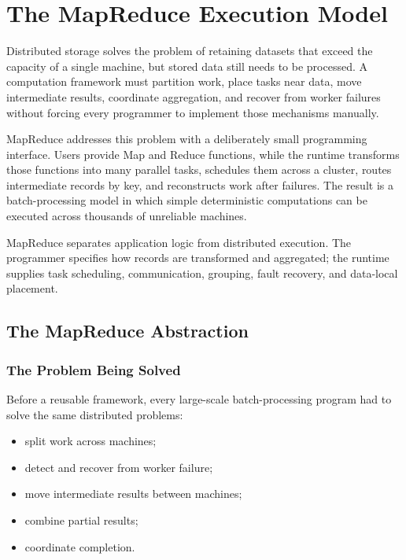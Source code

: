 \documentclass[11pt,a4paper,oneside]{book}
\begin{document}
\chapter{The MapReduce Execution Model}
\label{chap:mapreduce}

Distributed storage solves the problem of retaining datasets that exceed the capacity of a single machine, but stored data still needs to be processed. A computation framework must partition work, place tasks near data, move intermediate results, coordinate aggregation, and recover from worker failures without forcing every programmer to implement those mechanisms manually.

MapReduce addresses this problem with a deliberately small programming interface. Users provide Map and Reduce functions, while the runtime transforms those functions into many parallel tasks, schedules them across a cluster, routes intermediate records by key, and reconstructs work after failures. The result is a batch-processing model in which simple deterministic computations can be executed across thousands of unreliable machines.

\begin{keyconcept}
MapReduce separates application logic from distributed execution. The programmer specifies how records are transformed and aggregated; the runtime supplies task scheduling, communication, grouping, fault recovery, and data-local placement.
\end{keyconcept}

\section{The MapReduce Abstraction}

\subsection{The Problem Being Solved}

Before a reusable framework, every large-scale batch-processing program had to solve the same distributed problems:

\begin{itemize}
    \item split work across machines;
    \item detect and recover from worker failure;
    \item move intermediate results between machines;
    \item combine partial results;
    \item coordinate completion.
\end{itemize}
\end{document}
